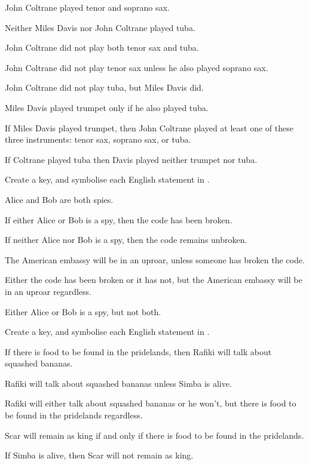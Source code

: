 \documentclass[PHIL101-Textbook.tex]{subfiles}
\begin{document}
\begin{earg}
\item John Coltrane played tenor and soprano sax.
\item Neither Miles Davis nor John Coltrane played tuba.
\item John Coltrane did not play both tenor sax and tuba.
\item John Coltrane did not play tenor sax unless he also played soprano sax.
\item John Coltrane did not play tuba, but Miles Davis did.
\item Miles Davis played trumpet only if he also played tuba.
\item If Miles Davis played trumpet, then John Coltrane played at least one of these three instruments: tenor sax, soprano sax, or tuba.
\item If Coltrane played tuba then Davis played neither trumpet nor tuba.
\end{earg}


\noindent\solutions
\problempart \label{pr.spies} Create a key, and symbolise each English statement in \tfl.
\begin{earg}
\item Alice and Bob are both spies.
\item If either Alice or Bob is a spy, then the code has been broken.
\item If neither Alice nor Bob is a spy, then the code remains unbroken.
\item The American embassy will be in an uproar, unless someone has broken the code.
\item Either the code has been broken or it has not, but the American embassy will be in an uproar regardless.
\item Either Alice or Bob is a spy, but not both.
\end{earg}


\noindent
\problempart Create a key, and symbolise each English statement in \tfl.
\begin{earg}
\item If there is food to be found in the pridelands, then Rafiki will talk about squashed bananas.
\item Rafiki will talk about squashed bananas unless Simba is alive.
\item Rafiki will either talk about squashed bananas or he won't, but there is food to be found in the pridelands regardless.
\item Scar will remain as king if and only if there is food to be found in the pridelands.
\item If Simba is alive, then Scar will not remain as king.
\end{earg}
\end{document}
